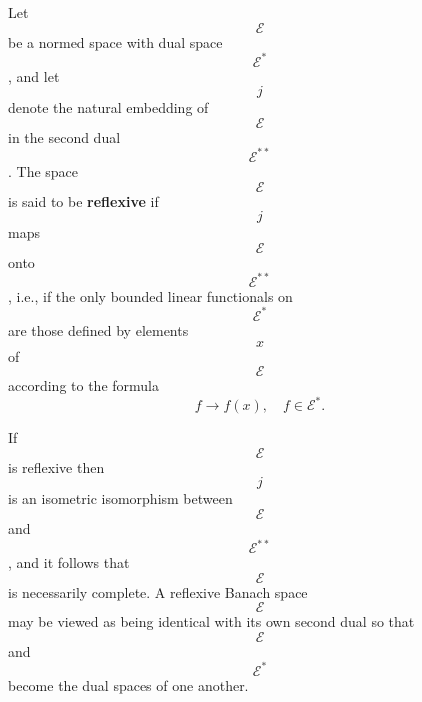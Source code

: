 Let $$\mathcal{E}$$ be a normed space with dual space $$\mathcal{E}^*$$, and let $$j$$ denote the natural embedding of $$\mathcal{E}$$ in the second dual $$\mathcal{E}^{**}$$. The space $$\mathcal{E}$$ is said to be \textbf{reflexive} if $$j$$ maps $$\mathcal{E}$$ onto $$\mathcal{E}^{**}$$, i.e., if the only bounded linear functionals on $$\mathcal{E}^*$$ are those defined by elements $$x$$ of $$\mathcal{E}$$ according to the formula
$$f \rightarrow f(x), \quad f \in \mathcal{E}^*.$$

If $$\mathcal{E}$$ is reflexive then $$j$$ is an isometric isomorphism between $$\mathcal{E}$$ and $$\mathcal{E}^{**}$$, and it follows that $$\mathcal{E}$$ is necessarily complete. A reflexive Banach space $$\mathcal{E}$$ may be viewed as being identical with its own second dual so that $$\mathcal{E}$$ and $$\mathcal{E}^*$$ become the dual spaces of one another.
